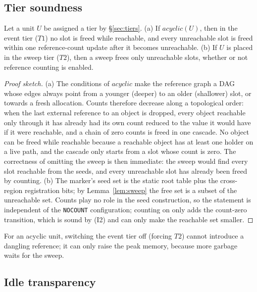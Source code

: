 \subsection{Tier soundness}
\label{sec:thm-tier}

\begin{theorem}
\label{thm:tier}
Let a unit $U$ be assigned a tier by \S\ref{sec:tiers}.
(a) If $\mathit{acyclic}(U)$, then in the event tier ($T1$) no slot is freed while reachable, and
every unreachable slot is freed within one reference-count update after it becomes unreachable.
(b) If $U$ is placed in the sweep tier ($T2$), then a sweep frees only unreachable slots, whether or
not reference counting is enabled.
\end{theorem}
\begin{proof}[Proof sketch]
(a) The conditions of $\mathit{acyclic}$ make the reference graph a DAG whose edges always point
from a younger (deeper) to an older (shallower) slot, or towards a fresh allocation. Counts
therefore decrease along a topological order: when the last external reference to an object is
dropped, every object reachable only through it has already had its own count reduced to the value
it would have if it were reachable, and a chain of zero counts is freed in one cascade.
No object can be freed while reachable because a reachable object has at least one holder on a live
path, and the cascade only starts from a slot whose count is zero.
The correctness of omitting the sweep is then immediate: the sweep would find every slot reachable
from the seeds, and every unreachable slot has already been freed by counting.
(b) The marker's seed set is the static root table plus the cross-region registration bits; by
Lemma~\ref{lem:sweep} the free set is a subset of the unreachable set. Counts play no role in the
seed construction, so the statement is independent of the \texttt{NOCOUNT} configuration; counting
on only adds the count-zero transition, which is sound by (I2) and can only make the reachable set
smaller.
\end{proof}

\begin{corollary}
\label{cor:tier-switch}
For an acyclic unit, switching the event tier off (forcing $T2$) cannot introduce a dangling
reference; it can only raise the peak memory, because more garbage waits for the sweep.
\end{corollary}

\subsection{Idle transparency}
\label{sec:thm-idle}

